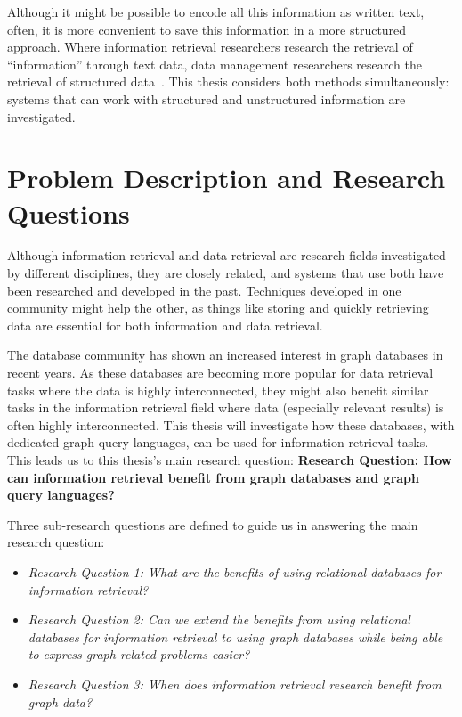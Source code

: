 Although it might be possible to encode all this information as written text, often, it is more convenient to save this information in a more structured approach. Where information retrieval researchers research the retrieval of ``information'' through text data, data management researchers research the retrieval of structured data~\citep{rijsbergen79information}. This thesis considers both methods simultaneously: systems that can work with structured and unstructured information are investigated.

\section{Problem Description and Research Questions}
Although information retrieval and data retrieval are research fields investigated by different disciplines, they are closely related, and systems that use both have been researched and developed in the past. Techniques developed in one community might help the other, as things like storing and quickly retrieving data are essential for both information and data retrieval. 

The database community has shown an increased interest in graph databases in recent years. As these databases are becoming more popular for data retrieval tasks where the data is highly interconnected, they might also benefit similar tasks in the information retrieval field where data (especially relevant results) is often highly interconnected. This thesis will investigate how these databases, with dedicated graph query languages, can be used for information retrieval tasks. This leads us to this thesis's main research question: \textbf{Research Question: How can information retrieval benefit from graph databases and graph query languages?}

Three sub-research questions are defined to guide us in answering the main research question:

\begin{itemize}
	\item \emph{Research Question 1: What are the benefits of using relational databases for information retrieval?} 
	\item \emph{Research Question 2: Can we extend the benefits from using relational databases for information retrieval to using graph databases while being able to express graph-related problems easier?}  
	\item \emph{Research Question 3: When does information retrieval research benefit from graph data?} 
\end{itemize}

